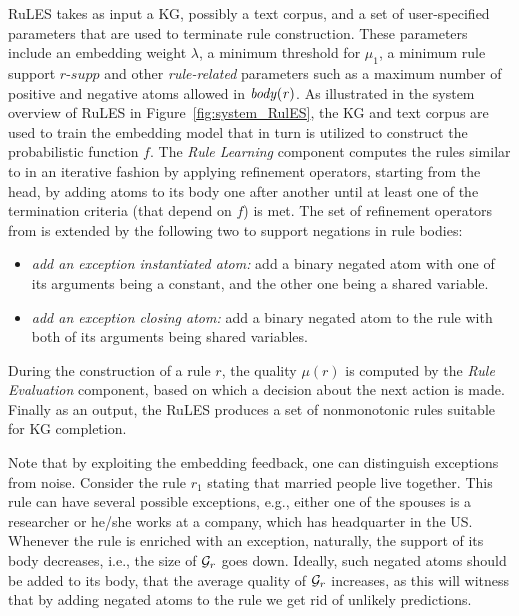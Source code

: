 
RuLES takes as input a KG, possibly a text corpus, and a set of user-specified parameters that are used to terminate rule construction.
These parameters include an embedding weight $\lambda$, 
a minimum threshold 
for $\mu_1$,  
a minimum rule support $\textit{r-supp}$ 
and other \emph{rule-related} parameters such as a maximum number of positive %
and negative 
atoms allowed in $\mathit{body(r)}$.
As illustrated in the system overview of RuLES in Figure~\ref{fig:system_RulES}, the KG and text corpus are used to train the embedding model that in turn is utilized to construct the probabilistic function $f$. The \emph{Rule Learning} component 
computes the rules
similar to \cite{amie} in an iterative fashion by applying refinement operators, starting from the head, by adding atoms to its body one after another until at least one of the termination criteria (that depend on $f$) is met. The set of refinement operators from \cite{amie} is extended by the following two to support negations in rule bodies:
\begin{itemize}
\item \emph{add an exception instantiated atom:} add a binary negated atom with one of its arguments
being a constant, and the other one being a shared variable.
\item \emph{add an exception closing atom:} add a binary negated atom to the rule with both of its
arguments being shared variables.%
\end{itemize}
 During the construction of a rule $r$, the quality $\mu(r)$ is computed by the \emph{Rule Evaluation} component, based on which a decision about the next action is made.
Finally as an output, the RuLES produces a set of nonmonotonic rules suitable for KG completion.

Note that by exploiting the embedding feedback, one can distinguish
exceptions from noise. Consider the rule $r_1$ stating that married people live together. This
rule can have several possible exceptions, e.g., either one of the spouses is a researcher
or he/she works at a company, which has headquarter in the US. Whenever the rule is
enriched with an exception, naturally, the support of its body decreases, i.e., the size of
$\mathcal{G}_r$ goes down. Ideally, such negated atoms should be added to its body, that the average quality of
$\mathcal{G}_r$ increases, as this will witness that by adding negated atoms to the rule we get rid of
unlikely predictions. 

